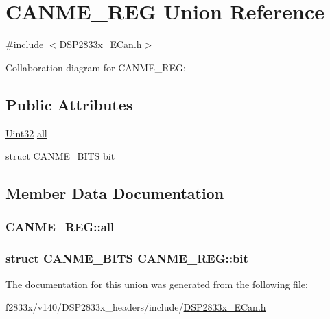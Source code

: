 \hypertarget{union_c_a_n_m_e___r_e_g}{}\section{C\+A\+N\+M\+E\+\_\+\+R\+E\+G Union Reference}
\label{union_c_a_n_m_e___r_e_g}


{\ttfamily \#include $<$D\+S\+P2833x\+\_\+\+E\+Can.\+h$>$}



Collaboration diagram for C\+A\+N\+M\+E\+\_\+\+R\+E\+G\+:
\subsection*{Public Attributes}
\begin{DoxyCompactItemize}
\item 
\hyperlink{_d_s_p2833x___device_8h_aba99025e657f892beb7ff31cecf64653}{Uint32} \hyperlink{union_c_a_n_m_e___r_e_g_aa076a9f9a8c9911fc4fb8ec3ca60aa67}{all}
\item 
struct \hyperlink{struct_c_a_n_m_e___b_i_t_s}{C\+A\+N\+M\+E\+\_\+\+B\+I\+T\+S} \hyperlink{union_c_a_n_m_e___r_e_g_ab3342978d4639cd2cca935d306f28ef6}{bit}
\end{DoxyCompactItemize}


\subsection{Member Data Documentation}
\hypertarget{union_c_a_n_m_e___r_e_g_aa076a9f9a8c9911fc4fb8ec3ca60aa67}{}
\subsubsection[{all}]{ C\+A\+N\+M\+E\+\_\+\+R\+E\+G\+::all}\label{union_c_a_n_m_e___r_e_g_aa076a9f9a8c9911fc4fb8ec3ca60aa67}
\hypertarget{union_c_a_n_m_e___r_e_g_ab3342978d4639cd2cca935d306f28ef6}{}
\subsubsection[{bit}]{\setlength{\rightskip}{0pt plus 5cm}struct {\bf C\+A\+N\+M\+E\+\_\+\+B\+I\+T\+S} C\+A\+N\+M\+E\+\_\+\+R\+E\+G\+::bit}\label{union_c_a_n_m_e___r_e_g_ab3342978d4639cd2cca935d306f28ef6}


The documentation for this union was generated from the following file\+:\begin{DoxyCompactItemize}
\item 
f2833x/v140/\+D\+S\+P2833x\+\_\+headers/include/\hyperlink{_d_s_p2833x___e_can_8h}{D\+S\+P2833x\+\_\+\+E\+Can.\+h}\end{DoxyCompactItemize}
